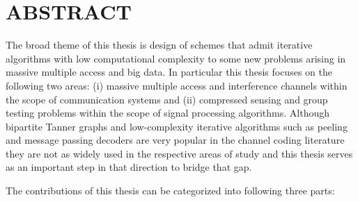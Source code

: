 \chapter*{ABSTRACT}

\pagestyle{plain} %
\setcounter{page}{2}

\indent The broad theme of this thesis is design of schemes that admit iterative algorithms with low computational complexity to some new problems arising in massive multiple access and big data. In particular this thesis focuses on the following two areas: (i) massive multiple access and interference channels within the scope of communication systems and (ii) compressed sensing and group testing problems within the scope of signal processing algorithms. Although bipartite Tanner graphs and low-complexity iterative algorithms such as peeling and message passing decoders are very popular in the channel coding literature \cite{richardson2008modern} they are not as widely used in the respective areas of study and this thesis serves as an important step in that direction to bridge that gap. 

The contributions of this thesis can be categorized into following three parts:


